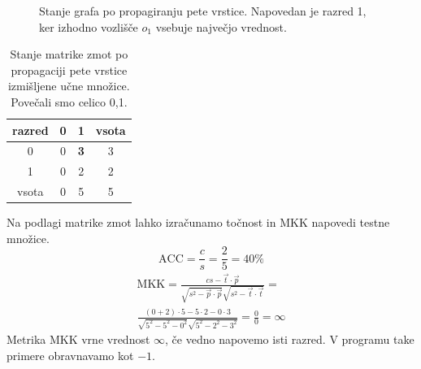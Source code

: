 \documentclass[a4paper,12pt,openright]{book}
\begin{document}
\begin{description}
{\begin{figure}[H]
                \caption{Stanje grafa po propagiranju pete vrstice. Napovedan je razred 1, ker izhodno vozlišče $o_1$ vsebuje največjo vrednost.}
                \label{fig:izracun_kakovosti_primer_5_vrstica}
            \end{figure}
            \begin{table}[H]
                \centering
                \begin{tabular}{||c c c c||}
                    \hline
                    razred & 0 & 1          & vsota \\ [0.5ex]
                    \hline
                    0      & 0 & \textbf{3} & 3     \\
                    \hline
                    1      & 0 & 2          & 2     \\
                    \hline
                    vsota  & 0 & 5          & 5     \\
                    \hline
                \end{tabular}
                \caption{Stanje matrike zmot po propagaciji pete vrstice izmišljene učne množice. Povečali smo celico 0,1.}
                \label{tab:izracun_kakovosti_cm_5}
            \end{table}}
    \end{description}

    \newpage

    Na podlagi matrike zmot lahko izračunamo točnost in MKK napovedi testne množice.
    \begin{equation}
        \text{ACC}=\frac{c}{s}=\frac{2}{5}=40\%\label{eq:tocnost_primer}
    \end{equation}
    \begin{equation}
        \begin{split}
            \text{MKK}={\frac {cs-{\vec {t}}\cdot {\vec {p}}}{{\sqrt {s^{2}-{\vec {p}}\cdot {\vec {p}}}}{\sqrt {s^{2}-{\vec {t}}\cdot {\vec {t}}}}}}= \\
            \frac{(0+2)\cdot 5 - 5\cdot 2 - 0 \cdot 3}{\sqrt{5^2-5^2-0^2}\sqrt{5^2-2^2-3^2}}=\frac{0}{0} = \infty
        \end{split}\label{eq:mcc_primer}
    \end{equation}
    Metrika MKK vrne vrednost $\infty$, če vedno napovemo isti razred.
    V programu take primere obravnavamo kot $-1$.
\end{document}
